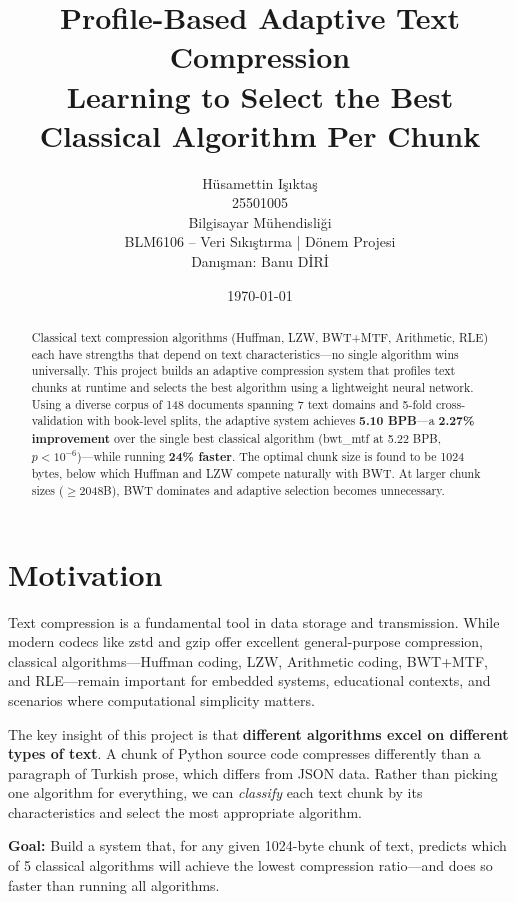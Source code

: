 \documentclass[12pt,a4paper]{article}
\title{\textbf{Profile-Based Adaptive Text Compression}\\
       \large Learning to Select the Best Classical Algorithm Per Chunk}
\author{Hüsamettin Işıktaş \\ 25501005 \\
        Bilgisayar Mühendisliği \\
        BLM6106 -- Veri Sıkıştırma | Dönem Projesi \\
        Danışman: Banu DİRİ}
\date{\today}
\begin{document}
\maketitle
\thispagestyle{empty}

\begin{abstract}
Classical text compression algorithms (Huffman, LZW, BWT+MTF, Arithmetic, RLE) each have strengths that depend on text characteristics---no single algorithm wins universally. This project builds an adaptive compression system that profiles text chunks at runtime and selects the best algorithm using a lightweight neural network. Using a diverse corpus of 148 documents spanning 7 text domains and 5-fold cross-validation with book-level splits, the adaptive system achieves \textbf{5.10 BPB}---a \textbf{2.27\% improvement} over the single best classical algorithm (bwt\_mtf at 5.22 BPB, $p < 10^{-6}$)---while running \textbf{24\% faster}. The optimal chunk size is found to be 1024 bytes, below which Huffman and LZW compete naturally with BWT. At larger chunk sizes ($\geq$2048B), BWT dominates and adaptive selection becomes unnecessary.
\end{abstract}

\section{Motivation}

Text compression is a fundamental tool in data storage and transmission. While modern codecs like zstd and gzip offer excellent general-purpose compression, classical algorithms---Huffman coding, LZW, Arithmetic coding, BWT+MTF, and RLE---remain important for embedded systems, educational contexts, and scenarios where computational simplicity matters.

The key insight of this project is that \textbf{different algorithms excel on different types of text}. A chunk of Python source code compresses differently than a paragraph of Turkish prose, which differs from JSON data. Rather than picking one algorithm for everything, we can \textit{classify} each text chunk by its characteristics and select the most appropriate algorithm.

\textbf{Goal:} Build a system that, for any given 1024-byte chunk of text, predicts which of 5 classical algorithms will achieve the lowest compression ratio---and does so faster than running all algorithms.
\end{document}
